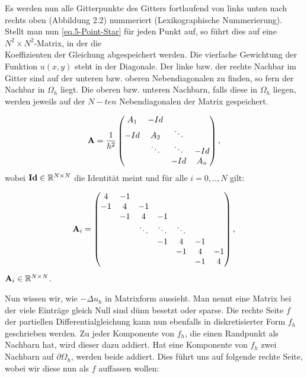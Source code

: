 \label{img.gridWithNumbers}

Es werden nun alle Gitterpunkte des Gitters fortlaufend von links unten nach rechts oben (Abbildung 2.2) nummeriert (Lexikographische Nummerierung). Stellt man nun \autoref{eq.5-Point-Star} für jeden Punkt auf, so führt dies auf eine $N^{2} \times N^{2}$-Matrix, in der die \\Koeffizienten der Gleichung abgespeichert werden. Die vierfache Gewichtung der Funktion $u(x,y)$ steht in der Diagonale. Der linke bzw. der rechte Nachbar im Gitter sind auf der unteren bzw. oberen Nebendiagonalen zu finden, so fern der Nachbar in $\Omega_{h}$ liegt. Die oberen bzw. unteren Nachbarn, falls diese in $\Omega_{h}$ liegen, werden jeweils auf der $N-ten$ Nebendiagonalen der Matrix gespeichert.

\begin{equation}
{\textbf{A}} = \frac{1}{h^{2}}
\begin{pmatrix}
A_{1} & -Id \\
-Id & A_{2} & \ddots \\
 & \ddots & \ddots & -Id \\
 & & -Id & A_{n}
\end{pmatrix},\label{eq.2D Matrix}
\end{equation}
wobei ${\textbf{Id}} \in \mathbb{R}^{N \times N}$ die Identität meint und für alle $i = 0,..,N$ gilt:

\begin{equation}
{\textbf{A}}_{i} =
\begin{pmatrix}
4 & -1\\
-1 & 4 & -1\\
   & -1 & 4 & -1\\
   &    & \ddots & \ddots & \ddots\\
   &    &        & -1 & 4 & -1\\
   &    &        &    & -1 & 4 & -1\\
   &    &        &    &    & -1 & 4
\end{pmatrix},
\end{equation}
${\textbf{A}}_{i} \in \mathbb{R}^{N \times N}$.

Nun wissen wir, wie $-\Delta u_{h}$ in Matrixform aussieht. Man nennt eine Matrix bei der viele Einträge gleich Null sind dünn besetzt oder sparse. Die rechte Seite $f$ der partiellen Differentialgleichung kann nun ebenfalls in diskretisierter Form $f_{h}$ geschrieben werden. Zu jeder Komponente von $f_{h}$, die einen Randpunkt als Nachbarn hat, wird dieser dazu addiert. Hat eine Komponente von $f_{h}$ zwei Nachbarn auf $\partial \Omega_{h}$, werden beide addiert. Dies führt uns auf folgende rechte Seite, wobei wir diese nun als $f$ auffassen wollen:

